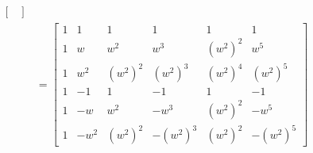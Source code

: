 \documentclass[a4paper]{article}
\begin{document}
{\begin{align*}
\begin{bmatrix}
	 \end{bmatrix} \\ 
	 & = \begin{bmatrix}
	 	1 & 1 & 1 & 1 & 1 & 1 \\
	 	1 & w & w^{2} & w^{3} & \!\left( w^{2} \right)^{2} & w^{5} \\
	 	1 & w^{2} & \!\left( w^{2} \right)^{2} & \!\left( w^{2} \right)^{3} & \!\left( w^{2} \right)^{4} & \!\left( w^{2} \right)^{5} \\
	 	1 & -1 & 1 & -1 & 1 & -1 \\
	 	1 & -w & w^{2} & -w^{3} & \!\left( w^{2} \right)^{2} & -w^{5} \\
	 	1 & -w^{2} & \!\left( w^{2} \right)^{2} & -\!\left( w^{2} \right)^{3} & \!\left( w^{2} \right)^{2} & -\!\left( w^{2} \right)^{5}
	 \end{bmatrix}
\end{align*}}

\end{document}
